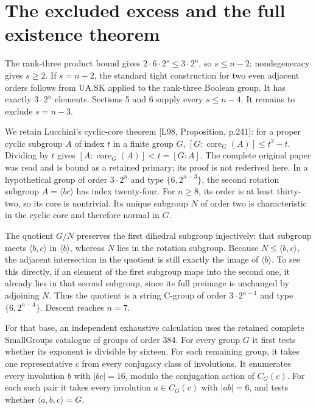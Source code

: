 \section{The excluded excess and the full existence theorem}\label{the-excluded-excess-and-the-full-existence-theorem}

The rank-three product bound gives
\(2\cdot6\cdot2^s\leq3\cdot2^n\), so \(s\leq n-2\); nondegeneracy
gives \(s\geq2\). If \(s=n-2\), the standard tight construction for two
even adjacent orders follows from UA.SK applied to the rank-three
Boolean group. It has exactly \(3\cdot2^n\) elements. Sections 5 and 6
supply every \(s\leq n-4\). It remains to exclude \(s=n-3\).

We retain Lucchini's cyclic-core theorem {[}L98, Proposition, p.241{]}: for a
proper cyclic subgroup \(A\) of index \(t\) in a finite group \(G\),
\([G:\operatorname{core}_G(A)]\leq t^2-t\). Dividing by \(t\) gives
\([A:\operatorname{core}_G(A)]<t=[G:A]\). The complete original paper was
read and is bound as a retained primary; its proof is not rederived here. In a hypothetical group of
order \(3\cdot2^n\) and type \(\{6,2^{n-3}\}\), the second rotation
subgroup \(A=\langle bc\rangle\) has index twenty-four. For \(n\geq8\),
its order is at least thirty-two, so its core is nontrivial. Its unique
subgroup \(N\) of order two is characteristic in the cyclic core and
therefore normal in \(G\).

The quotient \(G/N\) preserves the first dihedral subgroup injectively:
that subgroup meets \(\langle b,c\rangle\) in \(\langle b\rangle\),
whereas \(N\) lies in the rotation subgroup. Because
\(N\leq\langle b,c\rangle\), the adjacent intersection in the quotient
is still exactly the image of \(\langle b\rangle\). To see this
directly, if an element of the first subgroup maps into the second
one, it already lies in that second subgroup, since its full preimage
is unchanged by adjoining \(N\). Thus the quotient is a string C-group
of order \(3\cdot2^{n-1}\) and type \(\{6,2^{n-4}\}\). Descent reaches
\(n=7\).

For that base, an independent exhaustive calculation uses the retained
complete SmallGroups catalogue of groups of order 384. For every group
\(G\) it first tests whether its exponent is divisible by sixteen. For
each remaining group, it takes one representative \(c\) from every
conjugacy class of involutions. It enumerates every involution \(b\) with
\(|bc|=16\), modulo the conjugation action of \(C_G(c)\). For each such
pair it takes every involution \(a\in C_G(c)\) with \(|ab|=6\), and tests
whether \(\langle a,b,c\rangle=G\).

